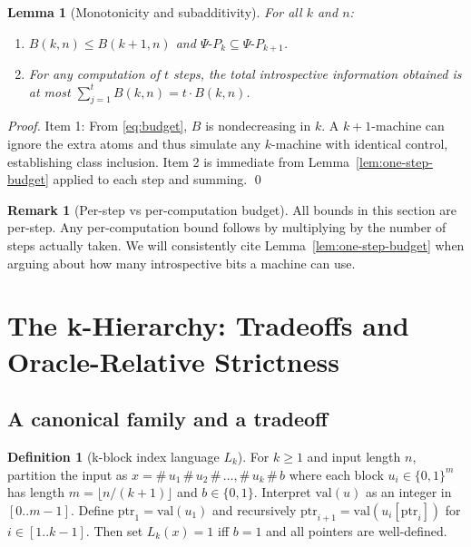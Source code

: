 \documentclass[11pt]{article}
\newtheorem{lemma}[theorem]{Lemma}
\theoremstyle{definition}
\newtheorem{definition}[theorem]{Definition}
\newtheorem{remark}[theorem]{Remark}
\newcommand{\PSi}{\Psi}
\newcommand{\bits}{\{0,1\}}
\begin{document}
\begin{lemma}[Monotonicity and subadditivity]
\label{lem:monotone}
For all $k$ and $n$:
\begin{enumerate}
  \item $B(k,n)\le B(k+1,n)$ and $\PSi\text{-}P_k\subseteq \PSi\text{-}P_{k+1}$.
  \item For any computation of $t$ steps, the total introspective information obtained is at most $\sum_{j=1}^{t} B(k,n) = t\cdot B(k,n)$.
\end{enumerate}
\end{lemma}

\begin{proof}
Item 1: From \eqref{eq:budget}, $B$ is nondecreasing in $k$. A $k{+}1$-machine can ignore the extra atoms and thus simulate any $k$-machine with identical control, establishing class inclusion. Item 2 is immediate from Lemma~\ref{lem:one-step-budget} applied to each step and summing. \qed
\end{proof}

\begin{remark}[Per-step vs per-computation budget]
All bounds in this section are per-step. Any per-computation bound follows by multiplying by the number of steps actually taken. We will consistently cite Lemma~\ref{lem:one-step-budget} when arguing about how many introspective bits a machine can use.
\end{remark}

\section{The k-Hierarchy: Tradeoffs and Oracle-Relative Strictness}

\subsection{A canonical family and a tradeoff}

\begin{definition}[k-block index language $L_k$]
\label{def:Lk}
For $k\ge1$ and input length $n$, partition the input as $x=\#\,u_1\,\#\,u_2\,\#\,\ldots,\#\,u_k\,\#\,b$ where each block $u_i\in\bits^{m}$ has length $m=\lfloor n/(k{+}1)\rfloor$ and $b\in\bits$. Interpret $\mathrm{val}(u)$ as an integer in $[0..m{-}1]$. Define $\mathrm{ptr}_1=\mathrm{val}(u_1)$ and recursively $\mathrm{ptr}_{i+1}=\mathrm{val}(u_{i}[\mathrm{ptr}_i])$ for $i\in[1..k{-}1]$. Then set $L_k(x)=1$ iff $b=1$ and all pointers are well-defined.
\end{definition}
\end{document}
